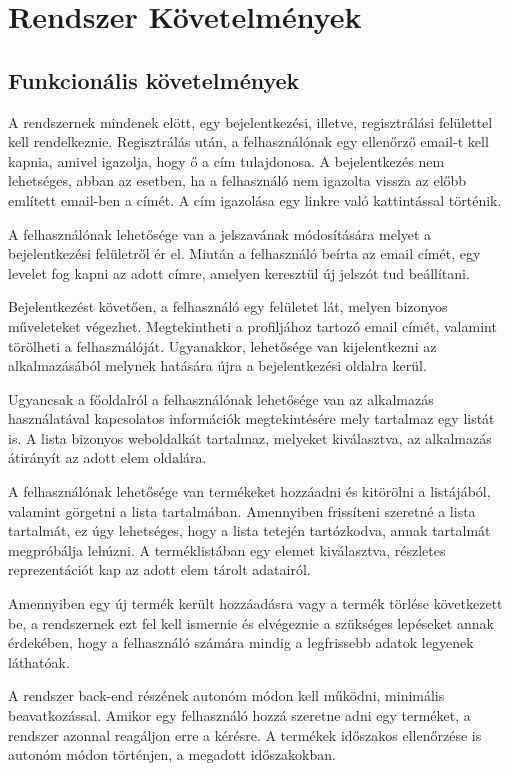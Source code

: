 \section{Rendszer Követelmények}

\subsection{Funkcionális követelmények}

A rendszernek mindenek elött, egy bejelentkezési, illetve, regisztrálási felülettel kell rendelkeznie. Regisztrálás után, a felhasználónak egy ellenőrző email-t kell kapnia, amivel igazolja, hogy ő a cím tulajdonosa. A bejelentkezés nem lehetséges, abban az esetben, ha a felhasználó nem igazolta vissza az előbb említett email-ben a címét. A cím igazolása egy linkre való kattintással történik.

A felhasználónak lehetősége van a jelszavának módosítására melyet a bejelentkezési felületről ér el. Miután a felhasználó beírta az email címét, egy levelet fog kapni az adott címre, amelyen keresztül új jelszót tud beállítani.

Bejelentkezést követően, a felhasználó egy felületet lát, melyen bizonyos műveleteket végezhet. Megtekintheti a profiljához tartozó email címét, valamint törölheti a felhasználóját. Ugyanakkor, lehetősége van kijelentkezni az alkalmazásából melynek hatására újra a bejelentkezési oldalra kerül.

Ugyancsak a főoldalról a felhasználónak lehetősége van az alkalmazás használatával kapcsolatos információk megtekintésére mely tartalmaz egy listát is. A lista bizonyos weboldalkát tartalmaz, melyeket kiválasztva, az alkalmazás átirányít az adott elem oldalára.

A felhasználónak lehetősége van termékeket hozzáadni és kitörölni a listájából, valamint görgetni a lista tartalmában. Amennyiben frissíteni szeretné a lista tartalmát, ez úgy lehetséges, hogy a lista tetején tartózkodva, annak tartalmát megpróbálja lehúzni. A terméklistában egy elemet kiválasztva, részletes reprezentációt kap az adott elem tárolt adatairól.

Amennyiben egy új termék került hozzáadásra vagy a termék törlése következett be, a rendszernek ezt fel kell ismernie és elvégeznie a szükséges lepéseket annak érdekében, hogy a felhasználó számára mindig a legfrissebb adatok legyenek láthatóak.

A rendszer back-end részének autonóm módon kell működni, minimális beavatkozással. Amikor egy felhasználó hozzá szeretne adni egy terméket, a rendszer azonnal reagáljon erre a kérésre. A termékek időszakos ellenőrzése is autonóm módon történjen, a megadott időszakokban.

